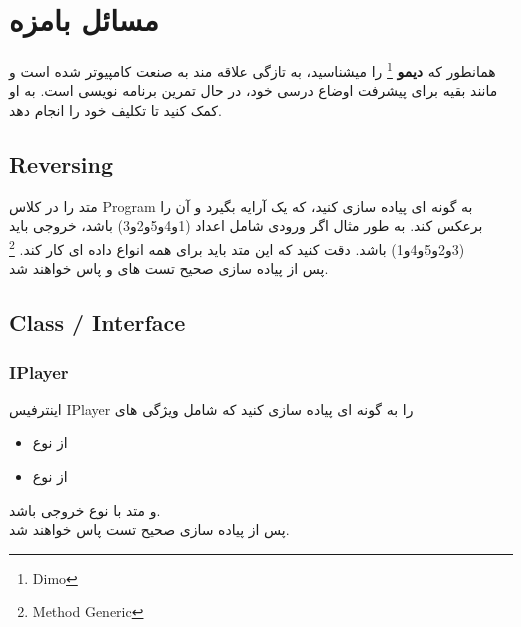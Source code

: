 
    \section{
    مسائل بامزه
    \grayBox{\textcolor{purple}{C\#}}
    }
    همانطور که 
    \textbf{دیمو}
    \footnote{Dimo}
    را میشناسید، به تازگی علاقه مند به صنعت کامپیوتر شده است و مانند بقیه برای پیشرفت اوضاع درسی خود، در حال تمرین برنامه نویسی است. به او کمک کنید تا تکلیف خود را انجام دهد.
    \subsection{
    Reversing
    }
        متد
        \grayBox{\textcolor{blue}{Reverse}}
        را در کلاس Program
         به گونه ای پیاده سازی کنید، که یک آرایه بگیرد و آن را برعکس کند.
        به طور مثال اگر ورودی شامل اعداد (1و4و5و2و3) باشد، خروجی باید (3و2و5و4و1) باشد.
        دقت کنید که این متد باید برای همه انواع داده ای کار کند.
        \footnote{Method Generic}
        \\
        پس از پیاده سازی صحیح تست های 
        \grayBox{\textcolor{dkgreen}{ReverseIntTest}}
        و
        \grayBox{\textcolor{dkgreen}{ReverseStringTest}}
        پاس خواهند شد.
        
    \subsection{Class / Interface
    }
        \subsubsection{IPlayer}
        اینترفیس 
        IPlayer
        را به گونه ای پیاده سازی کنید که شامل ویژگی های 
        \begin{itemize}
            \item {} از نوع \grayBox{\textcolor{blue}{bool}}
            \item {} از نوع \grayBox{\textcolor{blue}{bool}}
        \end{itemize}
        و متد
        با نوع خروجی 
        \grayBox{\textcolor{blue}{string}}
        باشد.
        \\
        پس از پیاده سازی صحیح تست 
        \grayBox{\textcolor{dkgreen}{IPlayerTest}}
        پاس خواهند شد.
        
